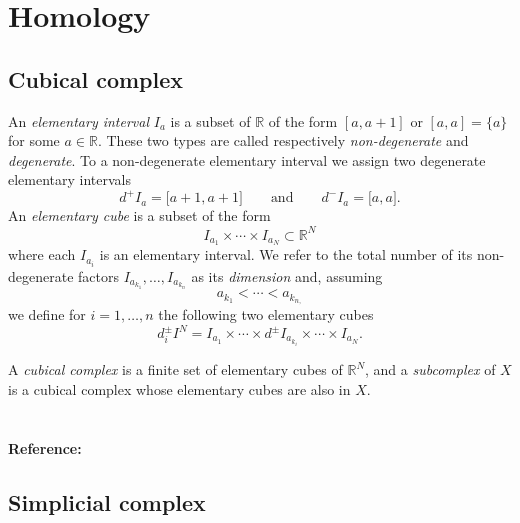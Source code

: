 \documentclass{amsart}
\begin{document}
	\section{Homology}
	
	\subsection*{Cubical complex} \label{cubical_complex}
	
	An \textit{elementary interval} $I_a$ is a subset of $\mathbb{R}$ of the form $[a, a+1]$ or $[a,a] = \{a\}$ for some $a \in \mathbb{R}$. These two types are called respectively \textit{non-degenerate} and \textit{degenerate}. To a non-degenerate elementary interval we assign two degenerate elementary intervals
	\begin{equation*}
	d^+ I_a = \lbrack a+1, a+1 \rbrack \qquad \text{and} \qquad d^- I_a = \lbrack a, a \rbrack.
	\end{equation*}
	An \textit{elementary cube} is a subset of the form 
	\begin{equation*}
	I_{a_1} \times \cdots \times I_{a_N} \subset \mathbb{R}^N
	\end{equation*}
	where each $I_{a_i}$ is an elementary interval. We refer to the total number of its non-degenerate factors $I_{a_{k_1}}, \dots, I_{a_{k_n}}$ as its \textit{dimension} and, assuming
	\begin{equation*}
	a_{k_1} < \cdots < a_{k_{n,}}
	\end{equation*}
	we define for $i = 1, \dots, n$ the following two elementary cubes
	\begin{equation*}
	d_i^\pm I^N = I_{a_1} \times \cdots \times d^\pm I_{a_{k_i}} \times \cdots \times I_{a_{N}}.
	\end{equation*}
	
	A \textit{cubical complex} is a finite set of elementary cubes of $\mathbb{R}^N$, and a \textit{subcomplex} of $X$ is a cubical complex whose elementary cubes are also in $X$.
	
	\paragraph{\\ Reference:} \cite{mischaikow04computational}
	
	\subsection*{Simplicial complex} \label{simplicial_complex}
	
\end{document}
